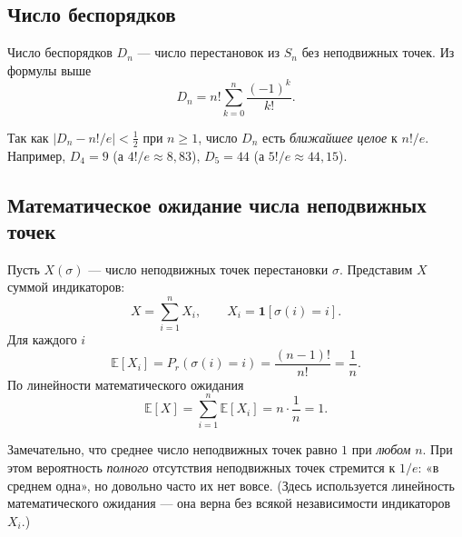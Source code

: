 \subsection{Число беспорядков}

\begin{Definition}{Число беспорядков}{}
	$D_n$ — число перестановок из $S_n$ без неподвижных точек. Из формулы выше
	\[
	D_n=n!\sum_{k=0}^n\frac{(-1)^k}{k!}.
	\]
\end{Definition}

\begin{Remark}{}{}
	Так как $\bigl|D_n-n!/e\bigr|<\tfrac12$ при $n\ge1$, число $D_n$ есть \emph{ближайшее целое} к $n!/e$. Например, $D_4=9$ (а $4!/e\approx8{,}83$), $D_5=44$ (а $5!/e\approx44{,}15$).
\end{Remark}

\subsection{Математическое ожидание числа неподвижных точек}

Пусть $X(\sigma)$ — число неподвижных точек перестановки $\sigma$. Представим $X$ суммой индикаторов:
\[
X=\sum_{i=1}^n X_i,\qquad X_i=\mathbf{1}[\sigma(i)=i].
\]
Для каждого $i$
\[
\mathbb{E}[X_i]=P_r(\sigma(i)=i)=\frac{(n-1)!}{n!}=\frac1n.
\]
По линейности математического ожидания
\[
\mathbb{E}[X]=\sum_{i=1}^n\mathbb{E}[X_i]=n\cdot\frac1n=1.
\]

\begin{Remark}{}{}
	Замечательно, что среднее число неподвижных точек равно $1$ при \emph{любом} $n$. При этом вероятность \emph{полного} отсутствия неподвижных точек стремится к $1/e$: «в среднем одна», но довольно часто их нет вовсе. (Здесь используется линейность математического ожидания — она верна без всякой независимости индикаторов $X_i$.)
\end{Remark}
